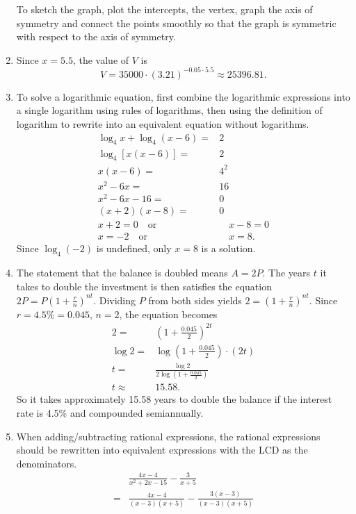 \documentclass[
  12pt]{article}
\begin{document}
\begin{enumerate}
  To sketch the graph, plot the intercepts, the vertex, graph the axis
  of symmetry and connect the points smoothly so that the graph is
  symmetric with respect to the axis of symmetry.
\item
  Since \(x=5.5\), the value of \(V\) is \[
  V=35000\cdot (3.21)^{-0.05\cdot 5.5}\approx 25396.81.
  \]
\item
  To solve a logarithmic equation, first combine the logarithmic
  expressions into a single logarithm using rules of logarithms, then
  using the definition of logarithm to rewrite into an equivalent
  equation without logarithms. \[
  \begin{aligned}
  \log_4x+\log_4(x-6)=&2\\
  \log_4[x(x-6)]=&2\\
  x(x-6)=&4^2\\
  x^2-6x=&16\\
  x^2-6x-16=&0\\
  (x+2)(x-8)=&0\\
  x+2=0\quad\text{or}&\quad x-8=0\\
  x=-2\quad\text{or}&\quad x=8.
  \end{aligned}
  \] Since \(\log_4(-2)\) is undefined, only \(x=8\) is a solution.
\item
  The statement that the balance is doubled means \(A=2P\). The years
  \(t\) it takes to double the investment is then satisfies the equation
  \(2P=P\left(1+\frac{r}{n}\right)^{nt}\). Dividing \(P\) from both
  sides yields \(2=\left(1+\frac{r}{n}\right)^{nt}\). Since
  \(r=4.5\%=0.045\), \(n=2\), the equation becomes \[
  \begin{aligned}
  2=&\left(1+\frac{0.045}{2}\right)^{2t}\\
  \log 2=&\log\left(1+\frac{0.045}{2}\right)\cdot (2t)\\
  t=&\frac{\log 2}{2\log\left(1+\frac{0.045}{2}\right)}\\
  t\approx&15.58.
  \end{aligned}
  \] So it takes approximately 15.58 years to double the balance if the
  interest rate is 4.5\% and compounded semiannually.
\item
  When adding/subtracting rational expressions, the rational expressions
  should be rewritten into equivalent expressions with the LCD as the
  denominators. \[
  \begin{aligned}
  &\frac{4x-4}{x^2+2x-15}-\frac{3}{x+5}\\
  =&\frac{4x-4}{(x-3)(x+5)}-\frac{3(x-3)}{(x-3)(x+5)}\\

\end{aligned}\]
\end{enumerate}
\end{document}
